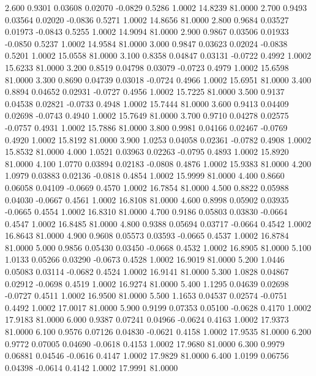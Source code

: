    2.600   0.9301   0.03608   0.02070  -0.0829   0.5286   1.0002  14.8239  81.0000
   2.700   0.9493   0.03564   0.02020  -0.0836   0.5271   1.0002  14.8656  81.0000
   2.800   0.9684   0.03527   0.01973  -0.0843   0.5255   1.0002  14.9094  81.0000
   2.900   0.9867   0.03506   0.01933  -0.0850   0.5237   1.0002  14.9584  81.0000
   3.000   0.9847   0.03623   0.02024  -0.0838   0.5201   1.0002  15.0558  81.0000
   3.100   0.8358   0.04847   0.03131  -0.0722   0.4992   1.0002  15.6233  81.0000
   3.200   0.8519   0.04798   0.03079  -0.0723   0.4979   1.0002  15.6598  81.0000
   3.300   0.8690   0.04739   0.03018  -0.0724   0.4966   1.0002  15.6951  81.0000
   3.400   0.8894   0.04652   0.02931  -0.0727   0.4956   1.0002  15.7225  81.0000
   3.500   0.9137   0.04538   0.02821  -0.0733   0.4948   1.0002  15.7444  81.0000
   3.600   0.9413   0.04409   0.02698  -0.0743   0.4940   1.0002  15.7649  81.0000
   3.700   0.9710   0.04278   0.02575  -0.0757   0.4931   1.0002  15.7886  81.0000
   3.800   0.9981   0.04166   0.02467  -0.0769   0.4920   1.0002  15.8192  81.0000
   3.900   1.0253   0.04058   0.02361  -0.0782   0.4908   1.0002  15.8532  81.0000
   4.000   1.0521   0.03963   0.02263  -0.0795   0.4893   1.0002  15.8920  81.0000
   4.100   1.0770   0.03894   0.02183  -0.0808   0.4876   1.0002  15.9383  81.0000
   4.200   1.0979   0.03883   0.02136  -0.0818   0.4854   1.0002  15.9999  81.0000
   4.400   0.8660   0.06058   0.04109  -0.0669   0.4570   1.0002  16.7854  81.0000
   4.500   0.8822   0.05988   0.04030  -0.0667   0.4561   1.0002  16.8108  81.0000
   4.600   0.8998   0.05902   0.03935  -0.0665   0.4554   1.0002  16.8310  81.0000
   4.700   0.9186   0.05803   0.03830  -0.0664   0.4547   1.0002  16.8485  81.0000
   4.800   0.9388   0.05694   0.03717  -0.0664   0.4542   1.0002  16.8643  81.0000
   4.900   0.9608   0.05573   0.03593  -0.0665   0.4537   1.0002  16.8784  81.0000
   5.000   0.9856   0.05430   0.03450  -0.0668   0.4532   1.0002  16.8905  81.0000
   5.100   1.0133   0.05266   0.03290  -0.0673   0.4528   1.0002  16.9019  81.0000
   5.200   1.0446   0.05083   0.03114  -0.0682   0.4524   1.0002  16.9141  81.0000
   5.300   1.0828   0.04867   0.02912  -0.0698   0.4519   1.0002  16.9274  81.0000
   5.400   1.1295   0.04639   0.02698  -0.0727   0.4511   1.0002  16.9500  81.0000
   5.500   1.1653   0.04537   0.02574  -0.0751   0.4492   1.0002  17.0017  81.0000
   5.900   0.9199   0.07353   0.05100  -0.0628   0.4170   1.0002  17.9183  81.0000
   6.000   0.9387   0.07241   0.04966  -0.0624   0.4163   1.0002  17.9373  81.0000
   6.100   0.9576   0.07126   0.04830  -0.0621   0.4158   1.0002  17.9535  81.0000
   6.200   0.9772   0.07005   0.04690  -0.0618   0.4153   1.0002  17.9680  81.0000
   6.300   0.9979   0.06881   0.04546  -0.0616   0.4147   1.0002  17.9829  81.0000
   6.400   1.0199   0.06756   0.04398  -0.0614   0.4142   1.0002  17.9991  81.0000
